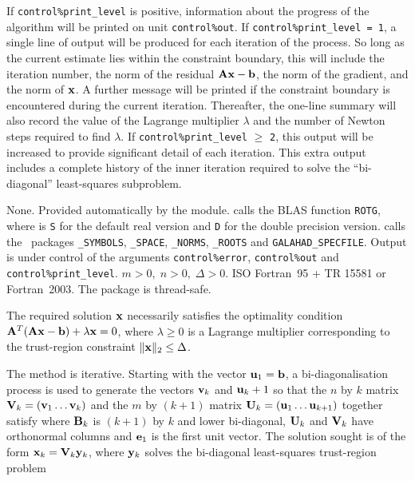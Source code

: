 \documentclass{galahad}
\newcommand{\packagename}{LS\-TR}
\begin{document}

\galinfo
If {\tt control\%print\_level} is positive, information about the progress
of the algorithm will be printed on unit {\tt control\-\%\-out}.
If {\tt control\%print\_level = 1}, a single line of output will be produced
for each iteration of the process. So long as the current estimate lies
within the constraint boundary, this will include
the iteration number, the norm of the residual ${\mathbf{A}}{\mathbf{x}}-{\mathbf{b}}$, the
norm of the gradient, and the norm of ${\mathbf{x}}$.
A further message will be printed
if the constraint boundary is encountered during the current iteration.
Thereafter, the one-line summary will also record the value of the Lagrange
multiplier $\lambda$ and the number of Newton steps required to find $\lambda$.
If {\tt control\%print\_level} $\geq$ {\tt 2}, this
output will be increased to provide significant detail of each iteration.
This extra output includes a complete history of the inner iteration required
to solve the ``bi-diagonal'' least-squares subproblem.


\galgeneral

\galcommon None.
\galworkspace Provided automatically by the module.
\galroutines {\tt \packagename\_solve} calls the
BLAS function {\tt *ROTG}, where {\tt *} is {\tt S} for
the default real version and {\tt D} for the double precision version.
\galmodules {\tt \packagename\_solve} calls the \galahad\ packages
{\tt \libraryname\_SY\-M\-BOLS},
{\tt \libraryname\_SPACE},
{\tt \libraryname\_NORMS},
{\tt \libraryname\_\-ROOTS} and
{\tt GALAHAD\_SPECFILE}.
\galio Output is under control of the arguments
{\tt control\%error}, {\tt control\%out} and {\tt control\%print\_level}.
\galrestrictions $m > 0, \; n  >  0, \;  \Delta  >  0$.
\galportability ISO Fortran~95 + TR 15581 or Fortran~2003.
The package is thread-safe.


\galmethod
The required solution ${\mathbf{x}}$ necessarily satisfies the optimality condition
${\mathbf{A}}^T ( {\mathbf{A}} {\mathbf{x}} - {\mathbf{b}} ) + \lambda {\mathbf{x}} = 0$, where $\lambda \geq 0$
is a Lagrange
multiplier corresponding to the trust-region constraint
$\|{\mathbf{x}}\|_2  \leq  \Delta$.

\noindent
The method is iterative. Starting  with the vector ${\mathbf{u}}_1 = {\mathbf{b}}$, a
bi-diagonalisation process is used to generate the vectors ${\mathbf{v}}_k$ and
${\mathbf{u}}_k+1$ so that the $n$ by $k$ matrix ${\mathbf{V}}_k = ( {\mathbf{v}}_1 \ldots {\mathbf{v}}_k)$
and the $m$ by $(k+1)$ matrix ${\mathbf{U}}_k = ( {\mathbf{u}}_1 \ldots {\mathbf{u}}_{k+1})$
together satisfy
where ${\mathbf{B}}_k$ is $(k+1)$ by $k$ and lower bi-diagonal, ${\mathbf{U}}_k$ and
${\mathbf{V}}_k$ have orthonormal columns and ${\mathbf{e}}_1$ is the first unit vector.
The solution sought is of the form ${\mathbf{x}}_k = {\mathbf{V}}_k {\mathbf{y}}_k$, where ${\mathbf{y}}_k$
solves the bi-diagonal least-squares trust-region problem
\end{document}
